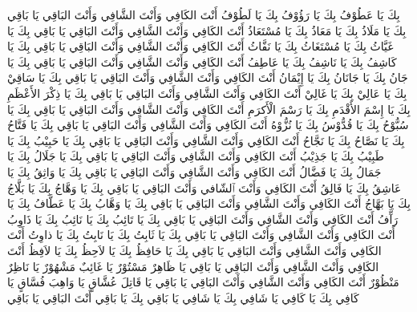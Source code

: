 بِكَ يَا عَطُوْفُ بِكَ يَا رَؤُوْفُ بِكَ يَا لَطُوْفُ أَنْتَ الكَافِي وَأَنْتَ الشَّافِي وَأَنْتَ البَاقِي يَا بَاقِي
بِكَ يَا مَلَاذُ بِكَ يَا مَعَاذُ بِكَ يَا مُسْتَعَاذُ أَنْتَ الكَافِي وَأَنْتَ الشَّافِي وَأَنْتَ البَاقِي يَا بَاقِي
بِكَ يَا غَيَّاثُ بِكَ يَا مُسْتَغَاثُ بِكَ يَا نَفَّاثُ أَنْتَ الكَافِي وَأَنْتَ الشَّافِي وَأَنْتَ البَاقِي يَا بَاقِي
بِكَ يَا كَاشِفُ بِكَ يَا نَاشِفُ بِكَ يَا عَاطِفُ أَنْتَ الكَافِي وَأَنْتَ الشَّافِي وَأَنْتَ البَاقِي يَا بَاقِي
بِكَ يَا جَانُ بِكَ يَا جَانَانُ بِكَ يَا إِيْمَانُ أَنْتَ الكَافِي وَأَنْتَ الشَّافِي وَأَنْتَ البَاقِي يَا بَاقِي
بِكَ يَا سَاقِيْ بِكَ يَا عَالِيْ بِكَ يَا غَالِيْ أَنْتَ الكَافِي وَأَنْتَ الشَّافِي وَأَنْتَ البَاقِي يَا بَاقِي
بِكَ يَا ذِكْرَ الأَعْظَمِ بِكَ يَا إِسْمَ الأَقْدَمِ بِكَ يَا رَسْمَ الْأَكرَمِ أَنْتَ الكَافِي وَأَنْتَ الشَّافِي وَأَنْتَ البَاقِي يَا بَاقِي
بِكَ يَا سُبُّوْحُ بِكَ يَا قُدُّوْسُ بِكَ يَا نُزُّوْهُ أَنْتَ الكَافِي وَأَنْتَ الشَّافِي وَأَنْتَ البَاقِي يَا بَاقِي
بِكَ يَا فَتَّاحُ بِكَ يَا نَصَّاحُ بِكَ يَا نَجَّاحُ أَنْتَ الكَافِي وَأَنْتَ الشَّافِي وَأَنْتَ البَاقِي يَا بَاقِي
بِكَ يَا حَبِيْبُ بِكَ يَا طَبِيْبُ بِكَ يَا جَذِيْبُ أَنْتَ الكَافِي وَأَنْتَ الشَّافِي وَأَنْتَ البَاقِي يَا بَاقِي
بِكَ يَا جَلَالُ بِكَ يَا جَمَالُ بِكَ يَا فَضَّالُ أَنْتَ الكَافِي وَأَنْتَ الشَّافِي وَأَنْتَ البَاقِي يَا بَاقِي
بِكَ يَا وَاثِقُ بِكَ يَا عَاشِقُ بِكَ يَا فَالِقُ أَنْتَ الكَافِي وَأَنْتَ ٱلشّافي وَأَنْتَ البَاقِي يَا بَاقِي
بِكَ يَا وَهَّاجُ بِكَ يَا بَلَّاجُ بِكَ يَا بَهَّاجُ أَنْتَ الكَافِي وَأَنْتَ الشَّافِي وَأَنْتَ البَاقِي يَا بَاقِي
بِكَ يَا وَهَّابُ بِكَ يَا عَطَّافُ بِكَ يَا رَآَّفُ أَنْتَ الكَافِي وَأَنْتَ الشَّافِي وَأَنْتَ البَاقِي يَا بَاقِي
بِكَ يَا تَائِبُ بِكَ يَا نَائِبُ بِكَ يَا ذَاوِبُ أَنْتَ الكَافِي وَأَنْتَ الشَّافِي وَأَنْتَ البَاقِي يَا بَاقِي
بِكَ يَا ثَابِتُ بِكَ يَا نَابِتُ بِكَ يَا ذاوِتُ أَنْتَ الكَافِي وَأَنْتَ الشَّافِي وَأَنْتَ البَاقِي يَا بَاقِي
بِكَ يَا حَافِظُ بِكَ يَا لاَحِظُ بِكَ يَا لاَفِظُ أَنْتَ الكَافِي وَأَنْتَ الشَّافِي وَأَنْتَ البَاقِي يَا بَاقِي
يَا ظَاهِرٌ مَسْتُوْرٌ يَا غَائِبٌ مَشْهُوْرٌ يَا نَاظِرٌ مَنْظُوْرٌ أَنْتَ الكَافِي وَأَنْتَ الشَّافِي وَأَنْتَ البَاقِي يَا بَاقِي
يَا قَاتِلَ عُشَّاقٍ يَا وَاهِبَ فُسَّاقٍ يَا كَافِي بِكَ يَا كَافِي يَا شَافِي بِكَ يَا شَافِي يَا بَاقِي بِكَ يَا بَاقِي أَنْتَ البَاقِي يَا بَاقِي
